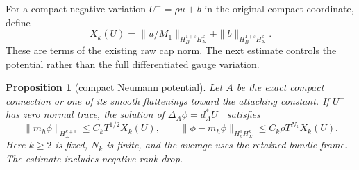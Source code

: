 \documentclass[11pt]{amsart}
\newtheorem{proposition}[theorem]{Proposition}
\theoremstyle{definition}
\theoremstyle{remark}
\theoremstyle{plain}
\begin{document}
For a compact negative variation $U^-=\rho u+b$ in the original
compact coordinate, define
\[
 X_k(U)=\|u/M_1\|_{H^{1+\varepsilon}_BH^k_\Sigma}
                         +\|b\|_{H^{1+\varepsilon}_BH^k_\Sigma}.
\]
These are terms of the existing raw cap norm.
The next estimate controls the potential rather than the
full differentiated gauge variation.

\begin{proposition}[compact Neumann potential]
\label{prop:excision-compact-potential}
Let $A$ be the exact compact connection or one of its smooth
flattenings toward the attaching constant. If $U^-$ has
zero normal trace, the solution of
$\Delta_A\phi=d_A^*U^-$ satisfies
\begin{equation}\label{eq:excision-compact-potential}
 \|m_h\phi\|_{H^{k+1}_\Sigma}\leq C_kT^{1/2}X_k(U),
 \qquad
 \|\phi-m_h\phi\|_{H^1_hH^k_\Sigma}
                              \leq C_k\rho T^{N_k}X_k(U).
\end{equation}
Here $k\geq2$ is fixed, $N_k$ is finite, and the average uses
the retained bundle frame. The estimate includes negative rank drop.
\end{proposition}
\end{document}
